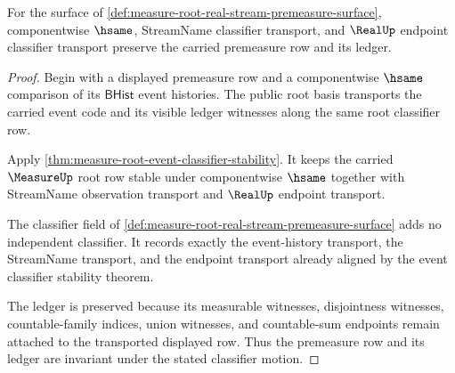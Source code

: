\begin{theorem}
\label{thm:measure-root-real-stream-premeasure-classifier-obligation}
For the surface of
\autoref{def:measure-root-real-stream-premeasure-surface}, componentwise
$\hsame$, StreamName classifier transport, and $\RealUp$ endpoint classifier
transport preserve the carried premeasure row and its ledger.
\end{theorem}
\begin{proof}
Begin with a displayed premeasure row and a componentwise $\hsame$ comparison
of its $\mathsf{BHist}$ event histories. The public root basis transports the
carried event code and its visible ledger witnesses along the same root
classifier row.

Apply \autoref{thm:measure-root-event-classifier-stability}. It keeps the
carried $\MeasureUp$ root row stable under componentwise $\hsame$ together
with StreamName observation transport and $\RealUp$ endpoint transport.

The classifier field of
\autoref{def:measure-root-real-stream-premeasure-surface} adds no independent
classifier. It records exactly the event-history transport, the StreamName
transport, and the endpoint transport already aligned by the event classifier
stability theorem.

The ledger is preserved because its measurable witnesses, disjointness
witnesses, countable-family indices, union witnesses, and countable-sum
endpoints remain attached to the transported displayed row. Thus the
premeasure row and its ledger are invariant under the stated classifier
motion.
\end{proof}

